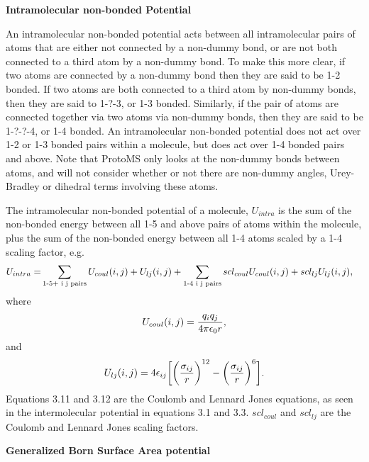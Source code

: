 \documentclass[letterpaper,10pt,english]{sphinxmanual}
\begin{document}
\textbf{Intramolecular non-bonded Potential}

An intramolecular non-bonded potential acts between all intramolecular pairs of atoms that are either not connected by a non-dummy bond, or are not both connected to a third atom by a non-dummy bond. To make this more clear, if two atoms are connected by a non-dummy bond then they are said to be 1-2 bonded. If two atoms are both connected to a third atom by non-dummy bonds, then they are said to 1-?-3, or 1-3 bonded. Similarly, if the pair of atoms are connected together via two atoms via non-dummy bonds, then they are said to be 1-?-?-4, or 1-4 bonded. An intramolecular non-bonded potential does not act over 1-2 or 1-3 bonded pairs within a molecule, but does act over 1-4 bonded pairs and above. Note that ProtoMS only looks at the non-dummy bonds between atoms, and will not consider whether or not there are non-dummy angles, Urey-Bradley or dihedral terms involving these atoms.

The intramolecular non-bonded potential of a molecule, \(U_{intra}\) is the sum of the non-bonded energy between all 1-5 and above pairs of atoms within the molecule, plus the sum of the non-bonded energy between all 1-4 atoms scaled by a 1-4 scaling factor, e.g.
\begin{gather}
\begin{split}U_{intra} = &\sum_{\text{1-5+ i j pairs}} U_{coul}(i,j) + U_{lj}(i,j) +
\sum_{\text{1-4 i j pairs}} scl_{coul} U_{coul}(i,j) + scl_{lj} U_{lj}(i,j),\end{split}\notag
\end{gather}
where
\begin{gather}
\begin{split}U_{coul}(i,j) = \frac{q_i q_j}{4\pi\epsilon_{0} r},\end{split}\notag
\end{gather}
and
\begin{gather}
\begin{split}U_{lj}(i,j) = 4\epsilon_{ij}\biggl[ \biggl(\frac{\sigma_{ij}}{r}\biggr)^{12} - \biggl(\frac{\sigma_{ij}}{r}\biggr)^6 \biggr].\end{split}\notag
\end{gather}
Equations 3.11 and 3.12 are the Coulomb and Lennard Jones equations, as seen in the intermolecular potential in equations 3.1 and 3.3. \(scl_{coul}\) and \(scl_{lj}\) are the Coulomb and Lennard Jones scaling factors.

\textbf{Generalized Born Surface Area potential}
\end{document}
